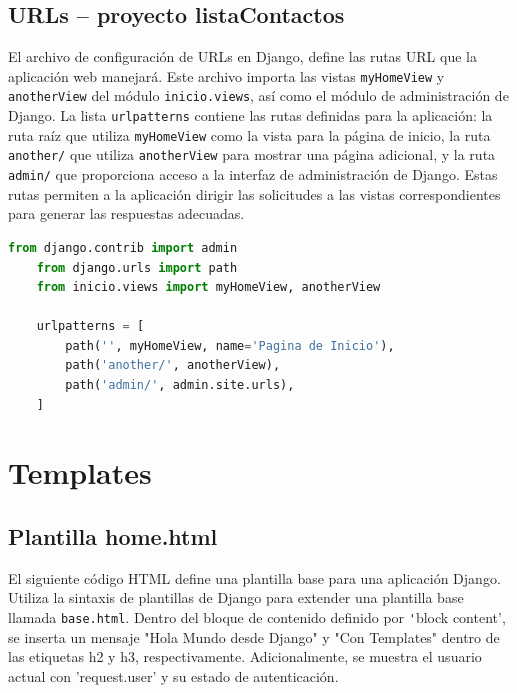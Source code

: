 \documentclass{article}
\begin{document}
  

  \subsection{URLs -- proyecto listaContactos}
  El archivo de configuración de URLs en Django, define las rutas URL que la aplicación web manejará. Este archivo importa 
  las vistas \texttt{myHomeView} y \texttt{anotherView} del módulo \texttt{inicio.views}, así como el módulo de administración 
  de Django. La lista \texttt{urlpatterns} contiene las rutas definidas para la aplicación: la ruta raíz que utiliza 
  \texttt{myHomeView} como la vista para la página de inicio, la ruta \texttt{another/} que utiliza \texttt{anotherView} 
  para mostrar una página adicional, y la ruta \texttt{admin/} que proporciona acceso a la interfaz de administración de 
  Django. Estas rutas permiten a la aplicación dirigir las solicitudes a las vistas correspondientes para generar las 
  respuestas adecuadas.

  \begin{lstlisting}[language=python]
    from django.contrib import admin
    from django.urls import path
    from inicio.views import myHomeView, anotherView

    urlpatterns = [
        path('', myHomeView, name='Pagina de Inicio'),
        path('another/', anotherView),
        path('admin/', admin.site.urls),
    ]
  \end{lstlisting}

  

  \section{Templates}
  

  \subsection{Plantilla home.html}
  El siguiente código HTML define una plantilla base para una aplicación Django. Utiliza la sintaxis de plantillas 
  de Django para extender una plantilla base llamada \texttt{base.html}. Dentro del bloque de contenido definido por 
  \texttt 'block content', se inserta un mensaje "Hola Mundo desde Django" y "Con Templates" dentro 
  de las etiquetas h2 y h3, respectivamente. Adicionalmente, se muestra 
  el usuario actual con 'request.user' y su estado de autenticación.
\end{document}
